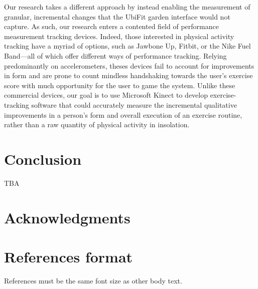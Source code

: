 \documentclass{sigchi}
\begin{document}
Our research takes a different approach by instead enabling the measurement of granular, incremental changes that the UbiFit garden interface would not capture. As such, our research enters a contented field of performance measurement tracking devices. Indeed, those interested in physical activity tracking have a myriad of options, such as Jawbone Up, Fitbit, or the Nike Fuel Band—all of which offer different ways of performance tracking. Relying predominantly on accelerometers, theses devices fail to account for improvements in form and are prone to count mindless handshaking towards the user’s exercise score with much opportunity for the user to game the system. Unlike these commercial devices, our goal is to use Microsoft Kinect to develop exercise-tracking software that could accurately measure the incremental qualitative improvements in a person’s form and overall execution of an exercise routine, rather than a raw quantity of physical activity in insolation.

\section{Conclusion}

TBA

\section{Acknowledgments}
\section{References format}
References must be the same font size as other body text.



\end{document}

